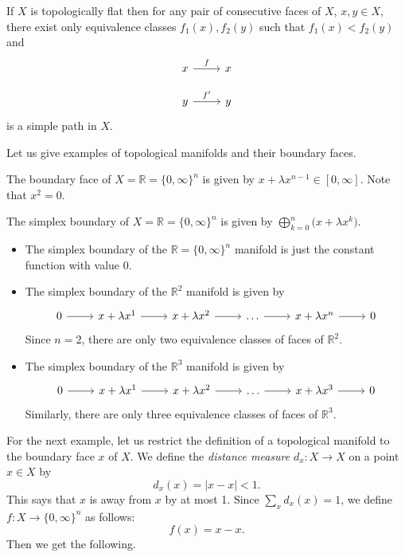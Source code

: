\documentclass[a4paper,reqno,oneside]{article}
\begin{document}
\begin{lemma} 
    If $X$ is topologically flat then for any pair of consecutive faces of $X$, $x,y \in X$, there exist only equivalence classes $f_1(x), f_2(y)$ such that $f_1(x) < f_2(y)$ and 
    \[ 
        \begin{tikzcd}
            x \ar[r, "f"] & x \\
            y \ar[r, "f'"] & y
        \end{tikzcd}
    \]
    is a simple path in $X$.   
\end{lemma}

Let us give examples of topological manifolds and their boundary faces. 

\begin{example} 
    The boundary face of $X = \mathbb{R} = \{0,\infty\}^n$ is given by $x + \lambda x^{n-1} \in [0,\infty]$. Note that $x^2 = 0$. 

    The simplex boundary of $X = \mathbb{R} = \{0,\infty\}^n$ is given by $\bigoplus_{k=0}^n \bigl( x + \lambda x^k \bigr)$. 
    \begin{itemize}
        \item The simplex boundary of the $\mathbb{R} = \{0,\infty\}^n$ manifold is just the constant function with value 0. 
        \item The simplex boundary of the $\mathbb{R}^2$ manifold is given by 
        \[\begin{tikzcd}
            0 \ar[r] & x + \lambda x^1 \ar[r] & x + \lambda x^2 \ar[r] & \dots \ar[r] & x + \lambda x^n \ar[r] & 0
        \end{tikzcd}\] 
        Since $n = 2$, there are only two equivalence classes of faces of $\mathbb{R}^2$. 
        \item The simplex boundary of the $\mathbb{R}^3$ manifold is given by 
        \[\begin{tikzcd}
            0 \ar[r] & x + \lambda x^1 \ar[r] & x + \lambda x^2 \ar[r] & \dots \ar[r] & x + \lambda x^3 \ar[r] & 0
        \end{tikzcd}\] 
        Similarly, there are only three equivalence classes of faces of $\mathbb{R}^3$. 
    \end{itemize} 
\end{example}

For the next example, let us restrict the definition of a topological manifold to the boundary face $x$ of $X$. 
We define the \emph{distance measure} $d_x: X \to X$ on a point $x \in X$ by 
\[
    d_x(x) = |x - x| < 1.
\]
This says that $x$ is away from $x$ by at most 1. Since $\sum_x d_x(x) = 1$, we define $f: X \to \{0,\infty\}^n$ as follows: 
\[
    f(x) = x - x. 
\]
Then we get the following. 
\end{document}
